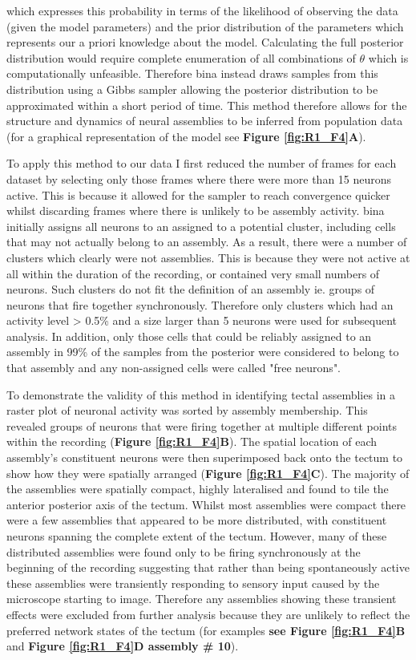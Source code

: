 which expresses this probability in terms of the likelihood of observing the data (given the model parameters) and the prior distribution of the parameters which represents our a priori knowledge about the model. Calculating the full posterior distribution would require complete enumeration of all combinations of $\theta$ which is computationally unfeasible. Therefore \gls{bina} instead draws samples from this distribution using a Gibbs sampler allowing the posterior distribution to be approximated within a short period of time. This method therefore allows for the structure and dynamics of neural assemblies to be inferred from population data (for a graphical representation of the model see \textbf{Figure \ref{fig:R1_F4}A}).

 To apply this method to our data I first reduced the number of frames for each dataset by selecting only those frames where there were more than 15 neurons active. This is because it allowed for the sampler to reach convergence quicker whilst discarding frames where there is unlikely to be assembly activity. \gls{bina} initially assigns all neurons to an assigned to a potential cluster, including cells that may not actually belong to an assembly. As a result, there were a number of clusters which clearly were not assemblies. This is because they were not active at all within the duration of the recording, or contained very small numbers of neurons.  Such clusters do not fit the definition of an assembly ie. groups of neurons that fire together synchronously. Therefore only clusters which had an activity level > 0.5\% and a size larger than 5 neurons were used for subsequent analysis. In addition, only those cells that could be reliably assigned to an assembly in 99\% of the samples from the posterior were considered to belong to that assembly and any non-assigned cells were called "free neurons".

To demonstrate the validity of this method in identifying tectal assemblies in  a raster plot of neuronal activity was sorted by assembly membership. This revealed groups of neurons that were firing together at multiple different points within the recording (\textbf{Figure \ref{fig:R1_F4}B}). The spatial location of each assembly's constituent neurons were then superimposed back onto the tectum to show how they were spatially arranged (\textbf{Figure \ref{fig:R1_F4}C}). The majority of the assemblies were spatially compact, highly lateralised and found to tile the anterior posterior axis of the tectum.  Whilst most assemblies were compact there were a few assemblies that appeared to be more distributed, with constituent neurons spanning the complete extent of the tectum. However, many of these distributed assemblies were found only to be firing synchronously at the beginning of the recording suggesting that rather than being spontaneously active these assemblies were transiently responding to sensory input caused by the microscope starting to image. Therefore any assemblies showing these transient effects were excluded from further analysis because they are unlikely to reflect the preferred network states of the tectum (for examples \textbf{see Figure \ref{fig:R1_F4}B} and \textbf{Figure \ref{fig:R1_F4}D  assembly \# 10}).

